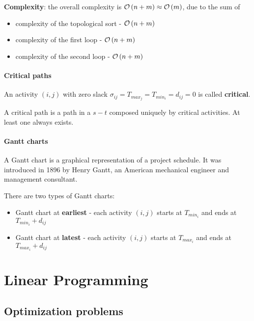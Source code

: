 \documentclass[english]{article}
\begin{document}
\bigskip
\textbf{Complexity}:
the overall complexity is \(\mathcal{O}\left(n+m\right) \approx \mathcal{O}\left(m\right)\), due to the sum of

\begin{itemize}
  \item complexity of the topological sort - \(\mathcal{O}\left(n+m\right)\)
  \item complexity of the first loop - \(\mathcal{O}\left(n+m\right)\)
  \item complexity of the second loop - \(\mathcal{O}\left(n+m\right)\)
\end{itemize}

\paragraph{Critical paths}

An activity \(\left( i, j \right)\) with zero slack \(\sigma_{ij} = T_{max_j} = T_{min_i} = d_{ij} = 0\) is called \textbf{critical}.

A critical path is a path in a \(s-t\) composed uniquely by critical activities.
At least one always exists.

\paragraph{Gantt charts}

A Gantt chart is a graphical representation of a project schedule.
It was introduced in 1896 by Henry Gantt, an American mechanical engineer and management consultant.

There are two types of Gantt charts:

\begin{itemize}
  \item Gantt chart at \textbf{earliest} - each activity \(\left( i, j \right)\) starts at \(T_{min_i}\) and ends at \(T_{min_i} + d_{ij}\)
  \item Gantt chart at \textbf{latest} - each activity \(\left( i, j \right)\) starts at \(T_{max_i}\) and ends at \(T_{max_i} + d_{ij}\)
\end{itemize}

\clearpage

\section{Linear Programming}

\subsection{Optimization problems}
\end{document}

